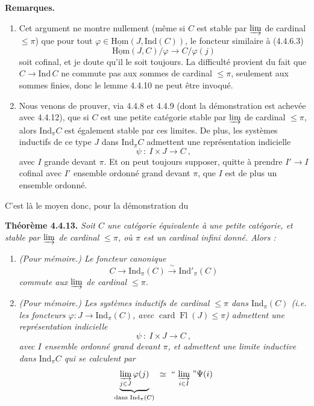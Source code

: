\documentclass[11pt]{article}
\newcommand{\msp}[1]{\marginpar{\footnotesize [#1]}}
\newcommand{\uHom}{\underline{\mathrm{Hom}}}
\newcommand{\Ind}{\mathrm{Ind}}
\newcommand{\Fl}{\operatorname{Fl}}
\newcommand{\card}{\operatorname{card}}
\begin{document}
\textbf{Remarques.}
\begin{enumerate}[label={}, leftmargin=*]
\item[1.] Cet argument ne montre nullement (même si $C$ est stable par $\varinjlim$ de cardinal $\leqslant \pi$) que pour tout $\varphi \in \uHom(J,\Ind(C))$, le foncteur similaire à (4.4.6.3)
\[
\uHom(J,C)/\varphi \longrightarrow C/\varphi(j)
\]
soit cofinal, et je doute qu'il le soit toujours. La difficulté provient du fait que $C \longrightarrow \Ind\, C$ ne commute pas aux sommes de cardinal $\leqslant \pi$, seulement aux sommes finies,
\msp{page 95}
donc le lemme 4.4.10 ne peut être invoqué.
\item[2.] Nous venons de prouver, via 4.4.8 et 4.4.9 (dont la démonstration est achevée avec 4.4.12), que si $C$ est une petite catégorie stable par $\varinjlim$ de cardinal $\leqslant \pi$, alors $\Ind_\pi C$ est également stable par ces limites. De plus, les systèmes inductifs de ce type $J$ dans $\Ind_\pi C$ admettent une représentation indicielle
\[
\psi \ :\ I \times J \longrightarrow C\ ,
\]
avec $I$ grande devant $\pi$. Et on peut toujours supposer, quitte à prendre $I' \longrightarrow I$ cofinal avec $I'$ ensemble ordonné grand devant $\pi$, que $I$ est de plus un ensemble ordonné.
\end{enumerate}

C'est là le moyen donc, pour la démonstration du

\textbf{Théorème 4.4.13.} \textit{Soit $C$ une catégorie équivalente à une petite catégorie, et stable par $\varinjlim$ de cardinal $\leqslant \pi$, où $\pi$ est un cardinal infini donné. Alors :}
\msp{page 96}

\begin{enumerate}[label={}, leftmargin=*]
\item[\textit{a)}] \textit{(Pour mémoire.) Le foncteur canonique}
\[
C \longrightarrow \Ind_\pi(C) \xrightarrow{\ \sim\ } \Ind'_\pi(C)
\]
\textit{commute aux $\varinjlim$ de cardinal $\leqslant \pi$.}
\item[\textit{b)}] \textit{(Pour mémoire.) Les systèmes inductifs de cardinal $\leqslant \pi$ dans $\Ind_\pi(C)$ (i.e. les foncteurs $\varphi : J \longrightarrow \Ind_\pi(C)$, avec $\card \Fl(J) \leqslant \pi$) admettent une représentation indicielle}
\[
\psi \ :\ I \times J \longrightarrow C\ ,
\]
\textit{avec $I$ ensemble ordonné grand devant $\pi$, et admettent une limite inductive dans $\Ind_\pi C$ qui se calculent par}
\[
\underbrace{\varinjlim_{j\in J} \varphi(j)}_{\text{dans } \Ind_\pi(C)} \ \simeq\ \text{“}\,\varinjlim_{i\in I}\,\text{”}\Psi(i)
\]
\end{enumerate}
\end{document}
